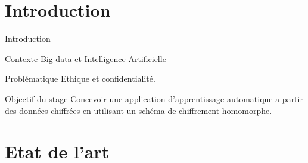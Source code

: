 \documentclass{beamer}
\begin{document}
\section{Introduction}



\begin{frame}{Introduction}
\begin{block}{Contexte}
Big data et Intelligence Artificielle
\end{block}


\begin{block}{Problématique}
Ethique et confidentialité.
\end{block}


\begin{block}{Objectif du stage}
Concevoir une application d'apprentissage automatique a partir des données chiffrées en utilisant un schéma de chiffrement homomorphe.
\end{block}
\end{frame}

%
\section{Etat de l'art}
  

\end{document}
